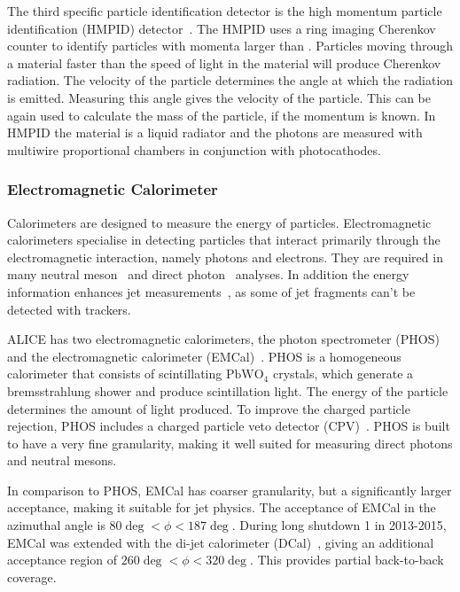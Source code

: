 The third specific particle identification detector is the high momentum particle identification (HMPID) detector~\cite{Beole:1998yq}. The HMPID uses a ring imaging Cherenkov counter to identify particles with momenta larger than \unit[1]{\gev}. Particles moving through a material faster than the speed of light in the material will produce Cherenkov radiation. The velocity of the particle determines the angle at which the radiation is emitted. Measuring this angle gives the velocity of the particle. This can be again used to calculate the mass of the particle, if the momentum is known. In HMPID the material is a liquid radiator and the photons are measured with multiwire proportional chambers in conjunction with photocathodes. 




\subsubsection{Electromagnetic Calorimeter}
\label{sec:emcal}
Calorimeters are designed to measure the energy of particles. Electromagnetic calorimeters specialise in detecting particles that interact primarily through the electromagnetic interaction, namely photons and electrons. They are required in many neutral meson~\cite{Abelev:2012cn} and direct photon~\cite{Adam:2015lda} analyses. In addition the energy information enhances jet measurements~\cite{Reed:2013rpa}, as some of jet fragments can't be detected with trackers.
\setlength{\emergencystretch}{3em}


ALICE has two electromagnetic calorimeters, the photon spectrometer (PHOS)~\cite{PHOS} and the electromagnetic calorimeter (EMCal)~\cite{Cortese:2008zza}. PHOS is a homogeneous calorimeter that consists of scintillating $\mathrm{PbWO_4}$ crystals, which generate a bremsstrahlung  shower and produce scintillation light. The energy of the particle determines the amount of light produced. To improve the charged particle rejection, PHOS includes a charged particle veto detector (CPV)~\cite{PHOS}. PHOS is built to have a very fine granularity, making it well suited for measuring direct photons and neutral mesons.

In comparison to PHOS, EMCal has coarser granularity, but a significantly larger acceptance, making it suitable for jet physics. The acceptance of EMCal in the azimuthal angle is $ 80\deg < \phi < 187 \deg$. During long shutdown 1 in 2013-2015, EMCal was extended with the di-jet calorimeter (DCal)~\cite{DCAL}, giving an additional acceptance region of $ 260\deg < \phi < 320 \deg$. This provides partial back-to-back coverage. 

